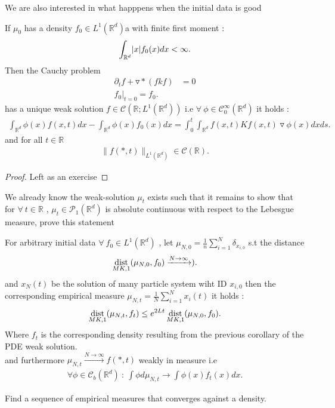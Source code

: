 We are also interested in what happpens when the initial data is good
\begin{corollary}
 If $\mu_{0}$  has a density  $f_{0} \in  L^{1}(\mathbb{R}^{d} ) $a with finite first moment : 
 \begin{align*}
   \int_{\mathbb{R}^{d} } \lvert x\rvert f_{0}(x) dx < \infty
 .\end{align*}
 Then the Cauchy problem 
 \begin{align*}
   \partial_t f  + \triangledown * (fkf) &= 0  \\
   f_0 \vert_{t=0} = f_{0}
 .\end{align*}
 has a unique weak solution $f \in  \mathcal{C}(\mathbb{R};L^{1}(\mathbb{R}^{d} ) )$ i.e $\forall \ \phi  \in  \mathcal{C}_0^{\infty}(\mathbb{R}^{d} ) $ it holds : 
 \begin{align*}
   \int_{\mathbb{R}^{d} }\phi(x) f(x,t) dx - \int_{\mathbb{R}^{d} }\phi(x) f_0(x) dx = \int_0^{t} \int_{\mathbb{R}^{d} } f(x,t)Kf(x,t) \triangledown \phi(x) dx ds
 .\end{align*}
 and  for all $t \in  \mathbb{R}$
 \begin{align*}
   \|f(*,t)\|_{L^{1}(\mathbb{R}^{d} ) } \in  \mathcal{C}(\mathbb{R})
 .\end{align*}
\end{corollary}
\begin{proof}
  Left as an exercise
\end{proof}
\begin{exercise}
We already know the weak-solution $\mu_t$  exists such that it remains to show that for $\forall \ t \in  \mathbb{R}$ , $\mu_t \in  \mathcal{P}_1(\mathbb{R}^{d} )$ is absolute continuous 
with respect to the Lebesgue measure, prove this statement
\end{exercise}
\begin{theorem}
  For arbitrary initial data $\forall \ f_{0} \in  L^{1}(\mathbb{R}^{d} ) $ , let $\mu_{N,0} = \frac{1}{n} \sum_{i=1 }^{N} \delta_{x_{i,0}} $
  s.t the distance 
  \begin{align*}
    \operatorname*{dist}_{MK,1}(\mu_{N,0},f_{0}) \xrightarrow{N \to \infty} )
  .\end{align*}
  and $x_N(t)$ be the solution of many particle system wiht ID $x_{i,0}$ then 
  the corresponding empirical measure $\mu_{N,t} = \frac{1}{N} \sum_{i=1 }^{N} x_{i}(t) $ it holds : 
  \begin{align*}
    \operatorname*{dist}_{MK,1}(\mu_{N,t},f_t) \le  e^{2Lt} \operatorname*{dist}_{MK,1}(\mu_{N,0},f_{0}) 
  .\end{align*}
  Where $f_t$ is the corresponding density resulting from the previous corollary of the PDE weak solution.\\[1ex]
  and furthermore $\mu_{N,t} \xrightarrow{N\to \infty} f(*,t)$ weakly in measure i.e 
  \begin{align*}
    \forall  \phi \in \mathcal{C}_b(\mathbb{R}^{d } ) \ : \ \int \phi  d\mu_{N,t} \to  \int \phi(x) f_t(x) dx
  .\end{align*}
\end{theorem}
\begin{exercise}
  Find a sequence of empirical measures that converges against a density.
\end{exercise}

